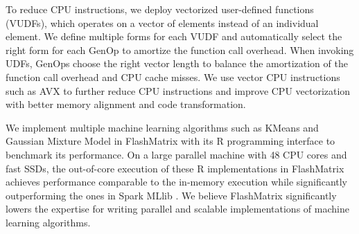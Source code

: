 To reduce CPU instructions, we deploy vectorized user-defined
functions (VUDFs), which operates on a vector of elements instead of
an individual element. We define multiple forms for each VUDF and automatically
select the right form for each GenOp to amortize the function call overhead.
When invoking UDFs, GenOps choose the right vector length to balance
the amortization of the function call overhead and CPU cache misses. We use
vector CPU instructions such as AVX \cite{avx} to further reduce CPU
instructions and improve CPU vectorization with better memory alignment
and code transformation.


We implement multiple machine learning algorithms such as KMeans \cite{kmeans}
and Gaussian Mixture Model \cite{gmm} in FlashMatrix with its R programming
interface to benchmark its performance. On a large parallel machine with 48
CPU cores and fast SSDs, the out-of-core execution of these R implementations
in FlashMatrix achieves performance comparable to the in-memory execution
while significantly outperforming the ones in Spark MLlib \cite{spark}.
We believe FlashMatrix significantly lowers the expertise for writing parallel
and scalable implementations of machine learning algorithms.
